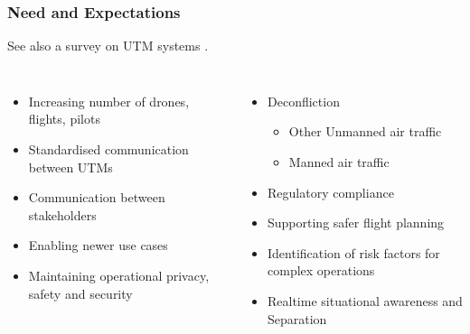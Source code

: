 \documentclass[usenames,dvipsnames,aspectratio=169,serif]{beamer}
\begin{document}
\begin{frame}
   \frametitle{Need and Expectations}
   See also a survey on UTM systems \cite{ISO-TR-23629-1-2020}.
   \begin{columns}[t]
      \begin{itemize}
         \item Increasing number of drones, flights, pilots
         \item Standardised communication between UTMs
         \item Communication between stakeholders
         \item Enabling newer use cases
         \item Maintaining operational privacy, safety and security
      \end{itemize}
      \begin{itemize}
         \item Deconfliction
            \begin{itemize}
               \item Other Unmanned air traffic
               \item Manned air traffic
            \end{itemize}
         \item Regulatory compliance
         \item Supporting safer flight planning
         \item Identification of risk factors for complex operations
         \item Realtime situational awareness and Separation
      \end{itemize}
   \end{columns}
\end{frame}

\end{document}
